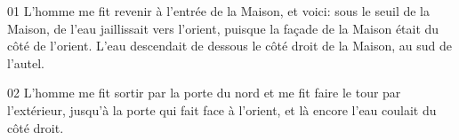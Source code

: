 01 L’homme me fit revenir à l’entrée de la Maison, et voici: sous le seuil de la Maison, de l’eau jaillissait vers l’orient, puisque la façade de la Maison était du côté de l’orient. L’eau descendait de dessous le côté droit de la Maison, au sud de l’autel.

02 L’homme me fit sortir par la porte du nord et me fit faire le tour par l’extérieur, jusqu’à la porte qui fait face à l’orient, et là encore l’eau coulait du côté droit.
